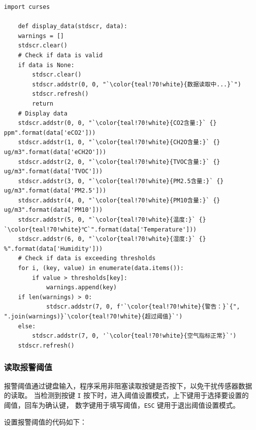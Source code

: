\documentclass[12pt,hyperref,a4paper,UTF8]{ctexart}
\begin{document}
\begin{lstlisting}[style=Pythonstyle,name=display_data.py]
    import curses
    
    def display_data(stdscr, data):
    warnings = []
    stdscr.clear()
    # Check if data is valid
    if data is None:
        stdscr.clear()
        stdscr.addstr(0, 0, "`\color{teal!70!white}{数据读取中...}`")
        stdscr.refresh()
        return
    # Display data
    stdscr.addstr(0, 0, "`\color{teal!70!white}{CO2含量:}` {} ppm".format(data['eCO2']))
    stdscr.addstr(1, 0, "`\color{teal!70!white}{CH2O含量:}` {} ug/m3".format(data['eCH2O']))
    stdscr.addstr(2, 0, "`\color{teal!70!white}{TVOC含量:}` {} ug/m3".format(data['TVOC']))
    stdscr.addstr(3, 0, "`\color{teal!70!white}{PM2.5含量:}` {} ug/m3".format(data['PM2.5']))
    stdscr.addstr(4, 0, "`\color{teal!70!white}{PM10含量:}` {} ug/m3".format(data['PM10']))
    stdscr.addstr(5, 0, "`\color{teal!70!white}{温度:}` {} `\color{teal!70!white}℃`".format(data['Temperature']))
    stdscr.addstr(6, 0, "`\color{teal!70!white}{湿度:}` {} %".format(data['Humidity']))
    # Check if data is exceeding thresholds
    for i, (key, value) in enumerate(data.items()):
        if value > thresholds[key]:
            warnings.append(key)
    if len(warnings) > 0:
            stdscr.addstr(7, 0, f'`\color{teal!70!white}{警告：}`{", ".join(warnings)}`\color{teal!70!white}{超过阈值}`')
    else:
        stdscr.addstr(7, 0, '`\color{teal!70!white}{空气指标正常}`')
    stdscr.refresh()

\end{lstlisting}

\subsubsection{读取报警阈值}
报警阈值通过键盘输入，程序采用非阻塞读取按键是否按下，以免干扰传感器数据的读取。
当检测到按键 \texttt{I} 按下时，进入阈值设置模式，上下键用于选择要设置的阈值，回车为确认键，
数字键用于填写阈值，\texttt{ESC} 键用于退出阈值设置模式。

设置报警阈值的代码如下：
\end{document}

